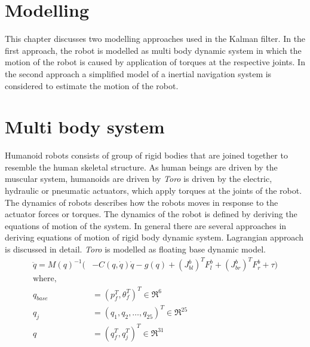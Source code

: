 \documentclass[12pt]{article}
\begin{document}
\newpage
\section{Modelling}
This chapter discusses two modelling approaches used in the Kalman filter.
In the first approach, the robot is modelled as multi body dynamic system in which the motion of the robot is caused by application of torques at the respective joints.
In the second approach a simplified model of a inertial navigation system is considered to estimate the motion of the robot.
\section{Multi body system}
Humanoid robots consists of group of rigid bodies that are joined together to resemble the human skeletal structure. As human beings are driven by the muscular system, humanoids are driven by \emph{Toro} is driven by the electric, hydraulic or pneumatic actuators, which apply torques at the joints of the robot. The dynamics of robots describes how the robots moves in response to the actuator forces or torques. The dynamics of the robot is defined by deriving the  equations of motion of the system. In general there are several approaches in deriving equations of motion of rigid body dynamic system. Lagrangian approach is discussed in detail.
\emph{Toro} is modelled as floating base dynamic model.
\begin{equation}
	\label{eq:motion}
	\begin{split}
	\ddot{q} = M(q)^{-1}(&-C(q,\dot{q})\dot{q} - g(q) + (J_{bl}^{b})^{T}F_{l}^{b} +(J_{br}^{b})^{T}F_{r}^{b} + \tau) \\
	\text{where,}\\
	q_{base} &= (p_{f}^{T},\theta_{f}^{T})^{T} \in \Re^{6} \\
	q_{j} &= (q_{1},q_{2},\ldots , q_{25})^{T} \in \Re^{25}\\
	q &= (q_{f}^{T}, q_{j}^{T})^{T} \in \Re^{31}\\
	\end{split}
\end{equation}
\end{document}
